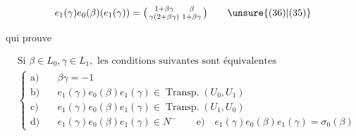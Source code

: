 \[
 e_1(\gamma)e_0(\beta)(e_1(\gamma))=\bigl(\begin{smallmatrix}1+\beta\gamma&\beta\\\gamma(2+\beta\gamma)&1+\beta\gamma\end{smallmatrix}\bigr)\tag*{\unsure{(36)|(35)}}
\]


qui prouve

\[
\begin{aligned}
 &\text{Si }\beta\in L_0,\gamma\in L_1,\text{ les conditions suivantes sont équivalentes}\\[-1pt]
 &\left\{\begin{aligned}
 \text{a)}\quad&\beta\gamma=-1\\
 \text{b)}\quad&e_1(\gamma)e_0(\beta)e_1(\gamma)\in\operatorname{Transp.}(U_0,U_1)\\
 \text{c)}\quad&e_1(\gamma)e_0(\beta)e_1(\gamma)\in\operatorname{Transp.}(U_1,U_0)\\
 \text{d)}\quad&e_1(\gamma)e_0(\beta)e_1(\gamma)\in N^-\qquad
 \text{e)}\quad e_1(\gamma)e_0(\beta)e_1(\gamma)=\sigma_0(\beta)
 \end{aligned}\right.
\end{aligned}\tag*{(37)}
\]

